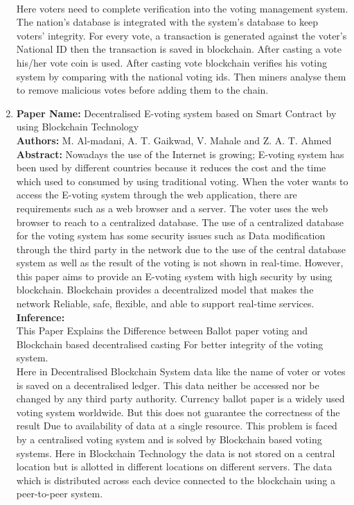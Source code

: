 \documentclass[oneside, 12pt]{book}
\begin{document}
\begin{enumerate}
					\\Here voters need to complete verification into the voting management system. The nation's database is integrated with the system's database to keep voters’ integrity. For every vote, a transaction is generated against the voter’s National ID then the transaction is saved in blockchain. After casting a vote his/her vote coin is used. After casting vote blockchain verifies his voting system by comparing with the national voting ids. Then miners analyse them to remove malicious votes before adding them to the chain.
				\item
					\textbf{Paper Name:} Decentralised E-voting system based on Smart Contract by using Blockchain Technology \cite{al2020decentralized}\\
					\textbf{Authors:} M. Al-madani, A. T. Gaikwad, V. Mahale and Z. A. T. Ahmed\\
					\textbf{Abstract:} Nowadays the use of the Internet is growing; E-voting system has been used by different countries because it reduces the cost and the time which used to consumed by using traditional voting. When the voter wants to access the E-voting system through the web application, there are requirements such as a web browser and a server. The voter uses the web browser to reach to a centralized database. The use of a centralized database for the voting system has some security issues such as Data modification through the third party in the network due to the use of the central database system as well as the result of the voting is not shown in real-time. However, this paper aims to provide an E-voting system with high security by using blockchain. Blockchain provides a decentralized model that makes the network Reliable, safe, flexible, and able to support real-time services.\\
					\textbf{Inference:}
					\\This Paper Explains the Difference between Ballot paper voting and Blockchain based decentralised casting For better integrity of the voting system.
					\\Here in Decentralised Blockchain System data like the name of voter or votes is saved on a decentralised ledger. This data neither be accessed nor be changed by any third party authority. Currency ballot paper is a widely used voting system worldwide. But this does not guarantee the correctness of the result Due to availability of data at a single resource. This problem is faced by a centralised voting system and is solved by Blockchain based voting systems. Here in Blockchain Technology the data is not stored on a central location but is allotted in different locations on different servers. The data which is distributed across each device connected to the blockchain using a peer-to-peer system.

\end{enumerate}
\end{document}
